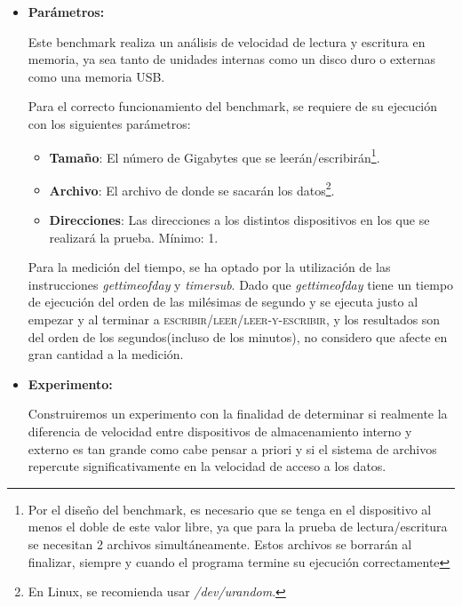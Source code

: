 \documentclass[paper=a4, fontsize=11pt]{scrartcl} %
\numberwithin{equation}{section} %
\numberwithin{figure}{section} %
\numberwithin{table}{section} %
\begin{document}
\begin{enumerate}
		\begin{itemize}
			\item \large\textbf{Parámetros:}
				
				Este benchmark realiza un análisis de velocidad de lectura y escritura en memoria, ya
				sea tanto de unidades internas como un disco duro o externas como una memoria USB.
				
				Para el correcto funcionamiento del benchmark, se requiere de su ejecución con los
				siguientes parámetros:
				
				\begin{itemize}
					\item \textbf{Tamaño}: El número de Gigabytes que se leerán/escribirán\footnote{Por
					el diseño del benchmark, es necesario que se tenga en el dispositivo al menos el
					doble de este valor libre, ya que para la prueba de lectura/escritura se necesitan
					2 archivos simultáneamente. Estos archivos se borrarán al finalizar, siempre y cuando
					el programa termine su ejecución correctamente}.
					
					\item \textbf{Archivo}: El archivo de donde se sacarán los datos\footnote{En Linux,
					se recomienda usar \textit{/dev/urandom}.}.
					
					\item \textbf{Direcciones}: Las direcciones a los distintos dispositivos en los que
					se realizará la prueba. Mínimo: 1.
				\end{itemize}
				
				Para la medición del tiempo, se ha optado por la utilización de las instrucciones
				\textit{gettimeofday} y \textit{timersub}. Dado que \textit{gettimeofday} tiene un
				tiempo de ejecución del orden de las milésimas de segundo y se ejecuta justo al empezar
				y al terminar a \textsc{escribir}/\textsc{leer}/\textsc{leer-y-escribir}, y los
				resultados son del orden de los segundos(incluso de los minutos), no considero que afecte
				en gran cantidad a la medición.
				
			\item \large\textbf{Experimento:}
				
				Construiremos un experimento con la finalidad de determinar si realmente la diferencia
				de velocidad entre dispositivos de almacenamiento interno y externo es tan grande como
				cabe pensar a priori y si el sistema de archivos repercute significativamente en la
				velocidad de acceso a los datos.
				

\end{itemize}
\end{enumerate}
\end{document}
